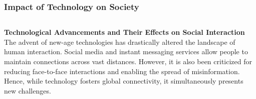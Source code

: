 \documentclass[5pt]{beamer}
\begin{document}
\begin{frame}
\frametitle{Impact of Technology on Society}
\begin{columns}
\begin{column}{0.7\textwidth}
\begin{block}{\textbf{Technological Advancements and Their Effects on Social Interaction}}
The advent of new-age technologies has drastically altered the landscape of human interaction. Social media and instant messaging services allow people to maintain connections across vast distances. However, it is also been criticized for reducing face-to-face interactions and enabling the spread of misinformation. Hence, while technology fosters global connectivity, it simultaneously presents new challenges.
\end{block}
\end{column}
\end{columns}
\end{frame}
\end{document}
